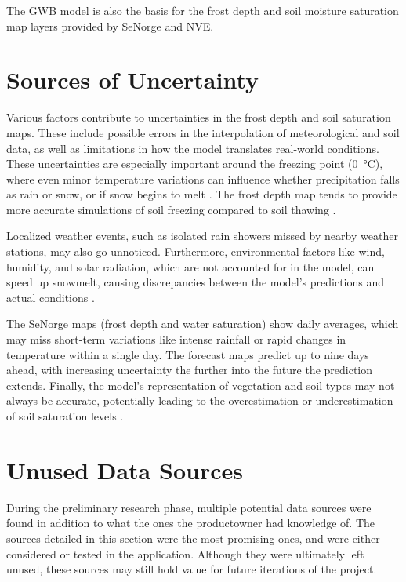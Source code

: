 The GWB model is also the basis for the frost depth and soil moisture saturation map layers provided by SeNorge and NVE.

\section{Sources of Uncertainty}\label{sec:mapdatasources:sourcesofuncertainty}

Various factors contribute to uncertainties in the frost depth and soil saturation maps. These include possible errors in the interpolation of meteorological and soil data, as well as limitations in how the model translates real-world conditions. These uncertainties are especially important around the freezing point (\qty{0}{\celsius}), where even minor temperature variations can influence whether precipitation falls as rain or snow, or if snow begins to melt \cite{senorge_watermap}. The frost depth map tends to provide more accurate simulations of soil freezing compared to soil thawing \cite{nve2025waterdata}.

Localized weather events, such as isolated rain showers missed by nearby weather stations, may also go unnoticed. Furthermore, environmental factors like wind, humidity, and solar radiation, which are not accounted for in the model, can speed up snowmelt, causing discrepancies between the model's predictions and actual conditions \cite{senorge_watermap}.

The SeNorge maps (frost depth and water saturation) show daily averages, which may miss short-term variations like intense rainfall or rapid changes in temperature within a single day. The forecast maps predict up to nine days ahead, with increasing uncertainty the further into the future the prediction extends. Finally, the model's representation of vegetation and soil types may not always be accurate, potentially leading to the overestimation or underestimation of soil saturation levels \cite{senorge_watermap}.

\section{Unused Data Sources}\label{sec:unuseddatasources}

During the preliminary research phase, multiple potential data sources were found in addition to what the ones the \gls{productowner} had knowledge of. The sources detailed in this section were the most promising ones, and were either considered or tested in the application. Although they were ultimately left unused, these sources may still hold value for future iterations of the project.

